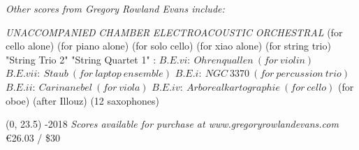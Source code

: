 \documentclass[10pt]{article}
\begin{document}

\begin{center}
\textit{\fontsize{.7cm}{1em}\selectfont Other scores from Gregory Rowland Evans include:} \hfill
\end{center}
\vspace*{4\baselineskip}
{
\begin{center}
\setlength{\columnseprule}{1pt}
\setlength{\columnsep}{6em}

\begin{paracol}{4}
\textit{\fontsize{.4cm}{1em}\selectfont UNACCOMPANIED}
\switchcolumn[1]
\textit{\fontsize{.4cm}{1em}\selectfont CHAMBER}
\switchcolumn[2]
\textit{\fontsize{.4cm}{1em}\selectfont ELECTROACOUSTIC}
\switchcolumn[3]
\textit{\fontsize{.4cm}{1em}\selectfont ORCHESTRAL}
\switchcolumn[0]
\fontsize{.1cm}{0.5em}  (for cello alone)
\switchcolumn[0]
\fontsize{.1cm}{0.5em}  (for piano alone)
\switchcolumn[0]
\fontsize{.1cm}{0.5em}  (for solo cello)
 \switchcolumn[0]
\fontsize{.1cm}{0.5em}  (for xiao alone)
\switchcolumn[1]
\fontsize{.1cm}{0.5em} 
\switchcolumn[1]
\fontsize{.1cm}{0.5em} 
\switchcolumn[1]
\fontsize{.1cm}{0.5em}  (for string trio)
\switchcolumn[1]
\fontsize{.1cm}{0.5em}  "String Trio 2"
\switchcolumn[1]
\fontsize{.1cm}{0.5em}  "String Quartet 1"
\switchcolumn[2]
\fontsize{.1cm}{0.5em} :
\switchcolumn[2]
\fontsize{.05cm}{0.5em} $B.E.vi: \ Ohrenquallen \ (for \ violin)$
\switchcolumn[2]
\fontsize{.05cm}{0.5em} $B.E.vii: \ Staub \ (for \ laptop \ ensemble)$
\switchcolumn[2]
\fontsize{.05cm}{0.5em} $B.E.i: \ NGC \ 3370 \ (for \ percussion \ trio)$
\switchcolumn[2]
\fontsize{.05cm}{0.5em} $B.E.ii: \ Carinanebel \ (for \ viola)$
\switchcolumn[2]
\fontsize{.05cm}{0.5em} $B.E.iv: \ Arborealkartographie \ (for \ cello)$
\switchcolumn[2]
\fontsize{.1cm}{0.5em}  (for oboe)
\switchcolumn[3]
\fontsize{.1cm}{0.5em} 
\switchcolumn[3]
\fontsize{.1cm}{0.5em}  (after Illouz)
\switchcolumn[3]
\fontsize{.1cm}{0.5em}  (12 saxophones)
 

\end{paracol}
\end{center}
}

\begin{textblock}{23}(0, 23.5)
-2018 \hfill
\textit{Scores available for purchase at www.gregoryrowlandevans.com} \hfill
\euro 26.03 / \$30
\end{textblock}
\end{document}
